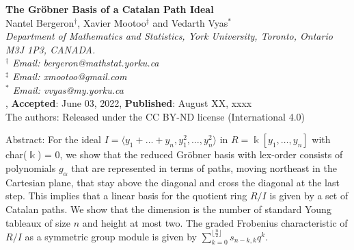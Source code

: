 \documentclass[10pt,a4paper]{article}
\def\field{\Bbbk}
\begin{document}
\baselineskip=0.20in

\vskip36pt


\begin{center}
{\large \bf The Gr\"obner Basis of a Catalan Path Ideal}\\[10pt]

Nantel Bergeron$^\dag$, Xavier Mootoo$^\ddag$ and Vedarth Vyas$^*$\\[20pt]

\footnotesize {\it Department of Mathematics and Statistics, York  University, Toronto, Ontario M3J 1P3, CANADA.\\
$^\dag$ Email: bergeron@mathstat.yorku.ca\\
$^\ddag$ Email: xmootoo@gmail.com\\
$^*$ Email: vvyas@my.yorku.ca}\\[10pt]

,
{\footnotesize {\bf Accepted}: June 03, 2022}, {\footnotesize {\bf Published}: August XX, xxxx}\\

\noindent The authors: Released under the CC BY-ND license (International 4.0)
\end{center}


\setcounter{page}{1} \thispagestyle{empty}

\baselineskip=0.30in

\normalsize

\noindent
{\sc Abstract:} For the ideal $I = \langle y_1 +  \dots + y_n, y^2_1, \dots , y^2_n \rangle$ in $R = \field[y_1, \dots , y_n]$ 
with char($\field$) = 0, we show that the reduced Gr\"obner basis with lex-order consists of polynomials $g_\alpha$ that are
represented in terms of paths, moving northeast in the Cartesian plane, that stay above the diagonal 
and cross the diagonal at the last step.  This implies that a linear basis for the quotient ring $R/I$ is given by a set of Catalan paths. We show that the dimension 
is the number of standard Young tableaux of size $n$ and height at most two. The graded Frobenius characteristic of $R/I$ as a symmetric group module is given by 
$\sum_{k=0}^{\lfloor \frac{n}{2} \rfloor } s_{n-k,k}q^k$.
\end{document}
